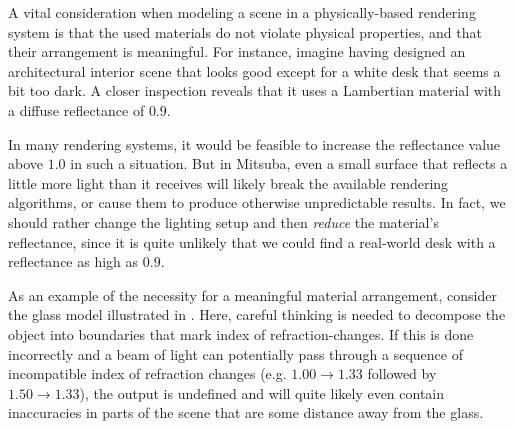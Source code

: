 A vital consideration when modeling a scene in a physically-based rendering 
system is that the used materials do not violate physical properties, and 
that their arrangement is meaningful. For instance, imagine having designed
an architectural interior scene that looks good except for a white desk that 
seems a bit too dark. A closer inspection reveals that it uses a Lambertian 
material with a diffuse reflectance of $0.9$. 

In many rendering systems, it would be feasible to increase the 
reflectance value above $1.0$ in such a situation. But in Mitsuba, even a 
small surface that reflects a little more light than it receives will 
likely break the available rendering algorithms, or cause them to produce otherwise 
unpredictable results. In fact, we should rather change the lighting setup and
then \emph{reduce} the material's reflectance, since it is quite unlikely that 
we could find a real-world desk with a reflectance as high as $0.9$.

As an example of the necessity for a meaningful material arrangement, consider
the glass model illustrated in . Here, careful thinking 
is needed to decompose the object into boundaries that mark index of 
refraction-changes. If this is done incorrectly and a beam of light can
potentially pass through a sequence of incompatible index of refraction changes (e.g. $1.00\to 1.33$
followed by $1.50\to1.33$), the output is undefined and will quite likely
even contain inaccuracies in parts of the scene that are some distance
away from the glass.


